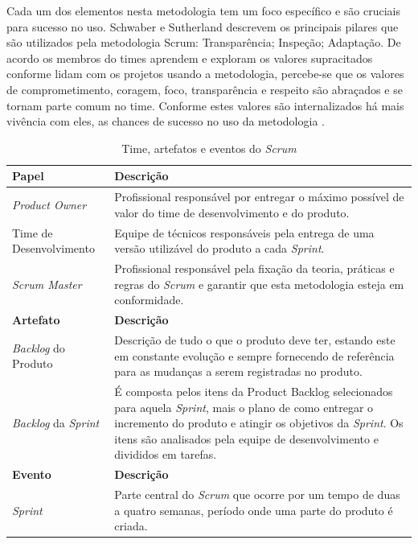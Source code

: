 Cada um dos elementos nesta metodologia tem um foco específico e são cruciais para sucesso no uso. Schwaber e Sutherland \cite{Scrum} descrevem os principais pilares que são utilizados pela metodologia Scrum: Transparência; Inspeção; Adaptação. De acordo os membros do times aprendem e exploram os valores supracitados conforme lidam com os projetos usando a metodologia, percebe-se que os valores de comprometimento, coragem, foco, transparência e respeito são abraçados e se tornam parte comum no time. Conforme estes valores são internalizados há mais vivência com eles, as chances de sucesso no uso da metodologia \cite{Scrum}.

\begin{table}[h!]
    \centering
    \caption{Time, artefatos e eventos do \textit{Scrum} \cite{Scrum}}
    \small
    \begin{tabular}{|p{3cm}|p{12cm}|}
        \hline
        \textbf{Papel} & \textbf{Descrição}\\ 
        \hline
        \textit{Product Owner} & Profissional responsável por entregar o máximo possível de valor do time de desenvolvimento e do produto.\\
        \hline
        Time de Desenvolvimento & Equipe de técnicos responsáveis pela entrega de uma versão utilizável do produto a cada \textit{Sprint}.\\
        \hline
        \textit{Scrum Master} & Profissional responsável pela fixação da teoria, práticas e regras do \textit{Scrum} e garantir que esta metodologia esteja em conformidade. \\
        \hline
        \textbf{Artefato} & \textbf{Descrição}\\  
        \hline
        \textit{Backlog} do Produto & Descrição de tudo o que o produto deve ter, estando este em constante evolução e sempre fornecendo de referência para as mudanças a serem registradas no produto.\\ 
        \hline
        \textit{Backlog} da \textit{Sprint} & É composta pelos itens da Product Backlog selecionados para aquela \textit{Sprint}, mais o plano de como entregar o incremento do produto e atingir os objetivos da \textit{Sprint}. Os itens são analisados pela equipe de desenvolvimento e divididos em tarefas. \\
        \hline
        \textbf{Evento} & \textbf{Descrição}\\
        \hline
        \textit{Sprint} & Parte central do \textit{Scrum} que ocorre por um tempo de duas a quatro semanas, período onde uma parte do produto é criada.\\

\end{tabular}
\end{table}

